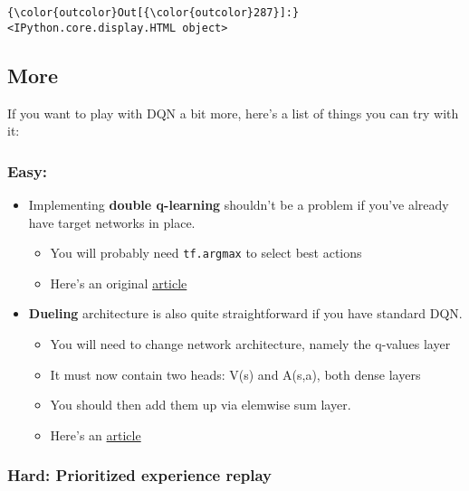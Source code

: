 \documentclass[11pt]{article}
\providecommand{\tightlist}{%
      \setlength{\itemsep}{0pt}\setlength{\parskip}{0pt}}
\begin{document}
\begin{Verbatim}[commandchars=\\\{\}]
{\color{outcolor}Out[{\color{outcolor}287}]:} <IPython.core.display.HTML object>
\end{Verbatim}
            
    \hypertarget{more}{%
\subsection{More}\label{more}}

If you want to play with DQN a bit more, here's a list of things you can
try with it:

\hypertarget{easy}{%
\subsubsection{Easy:}\label{easy}}

\begin{itemize}
\tightlist
\item
  Implementing \textbf{double q-learning} shouldn't be a problem if
  you've already have target networks in place.

  \begin{itemize}
  \tightlist
  \item
    You will probably need \texttt{tf.argmax} to select best actions
  \item
    Here's an original \href{https://arxiv.org/abs/1509.06461}{article}
  \end{itemize}
\item
  \textbf{Dueling} architecture is also quite straightforward if you
  have standard DQN.

  \begin{itemize}
  \tightlist
  \item
    You will need to change network architecture, namely the q-values
    layer
  \item
    It must now contain two heads: V(s) and A(s,a), both dense layers
  \item
    You should then add them up via elemwise sum layer.
  \item
    Here's an \href{https://arxiv.org/pdf/1511.06581.pdf}{article}
  \end{itemize}
\end{itemize}

    \hypertarget{hard-prioritized-experience-replay}{%
\subsubsection{Hard: Prioritized experience
replay}\label{hard-prioritized-experience-replay}}
\end{document}
